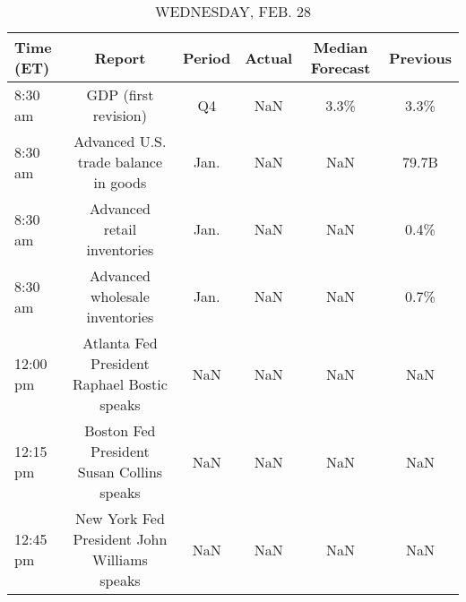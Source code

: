 \documentclass{article}%
\begin{document}
\begin{table}[htbp]%
\caption{WEDNESDAY, FEB. 28}%
\centering%
\begin{adjustbox}{width=1\textwidth}%
\begin{tabular}{lccccc}
\toprule
Time (ET) &                                      Report & Period & Actual & Median Forecast & Previous \\
\midrule
  8:30 am &                        GDP (first revision) &     Q4 &    NaN &            3.3\% &     3.3\% \\
  8:30 am &        Advanced U.S. trade balance in goods &   Jan. &    NaN &             NaN &    79.7B \\
  8:30 am &                 Advanced retail inventories &   Jan. &    NaN &             NaN &     0.4\% \\
  8:30 am &              Advanced wholesale inventories &   Jan. &    NaN &             NaN &     0.7\% \\
 12:00 pm & Atlanta Fed President Raphael Bostic speaks &    NaN &    NaN &             NaN &      NaN \\
 12:15 pm &   Boston Fed President Susan Collins speaks &    NaN &    NaN &             NaN &      NaN \\
 12:45 pm & New York Fed President John Williams speaks &    NaN &    NaN &             NaN &      NaN \\
\bottomrule
\end{tabular}
%
\end{adjustbox}%
\end{table}

%
\end{document}
